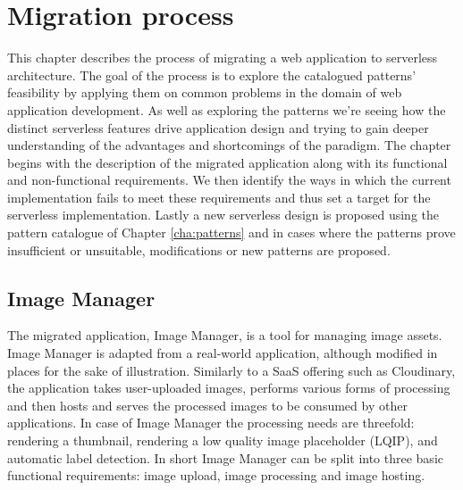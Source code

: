\chapter{Migration process} \label{cha:migration}

This chapter describes the process of migrating a web application to serverless architecture. The goal of the process is to explore the catalogued patterns' feasibility by applying them on common problems in the domain of web application development. As well as exploring the patterns we're seeing how the distinct serverless features drive application design and trying to gain deeper understanding of the advantages and shortcomings of the paradigm. The chapter begins with the description of the migrated application along with its functional and non-functional requirements. We then identify the ways in which the current implementation fails to meet these requirements and thus set a target for the serverless implementation. Lastly a new serverless design is proposed using the pattern catalogue of Chapter \ref{cha:patterns} and in cases where the patterns prove insufficient or unsuitable, modifications or new patterns are proposed.

\section{Image Manager}

The migrated application, Image Manager, is a tool for managing image assets. Image Manager is adapted from a real-world application, although modified in places for the sake of illustration. Similarly to a SaaS offering such as Cloudinary, the application takes user-uploaded images, performs various forms of processing and then hosts and serves the processed images to be consumed by other applications. In case of Image Manager the processing needs are threefold: rendering a thumbnail, rendering a low quality image placeholder (LQIP), and automatic label detection. In short Image Manager can be split into three basic functional requirements: image upload, image processing and image hosting.

